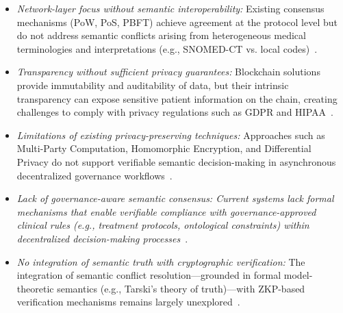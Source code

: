 \documentclass[journal]{IEEEtran}
\begin{document}
\begin{itemize}

\item \textit{Network-layer focus without semantic interoperability:} 
Existing consensus mechanisms (PoW, PoS, PBFT) achieve agreement at the protocol level but do not address semantic conflicts arising from heterogeneous medical terminologies and interpretations (e.g., SNOMED-CT vs. local codes)~\cite{Nasir2024, AlAwamy2025}.

\item \textit{Transparency without sufficient privacy guarantees:} 
Blockchain solutions provide immutability and auditability of data, but their intrinsic transparency can expose sensitive patient information on the chain, creating challenges to comply with privacy regulations such as GDPR and HIPAA~\cite{Andrew2023, Villarreal2023}.

\item \textit{Limitations of existing privacy-preserving techniques:} 
Approaches such as Multi-Party Computation, Homomorphic 
Encryption, and Differential Privacy do not support verifiable 
semantic decision-making in asynchronous decentralized 
governance workflows~\cite{Evans2018, Gentry2009}.

\item \textit{Lack of governance-aware semantic consensus: Current systems lack formal mechanisms that enable verifiable compliance with governance-approved clinical rules (e.g., treatment protocols, ontological constraints) within decentralized decision-making processes~\cite{Angurala2025, Amin2024}}.

\item \textit{No integration of semantic truth with cryptographic verification:} 
The integration of semantic conflict resolution—grounded in formal model-theoretic semantics (e.g., Tarski's theory of truth)—with ZKP-based verification mechanisms remains largely unexplored~\cite{Lavin2024}.

\end{itemize}
\end{document}
